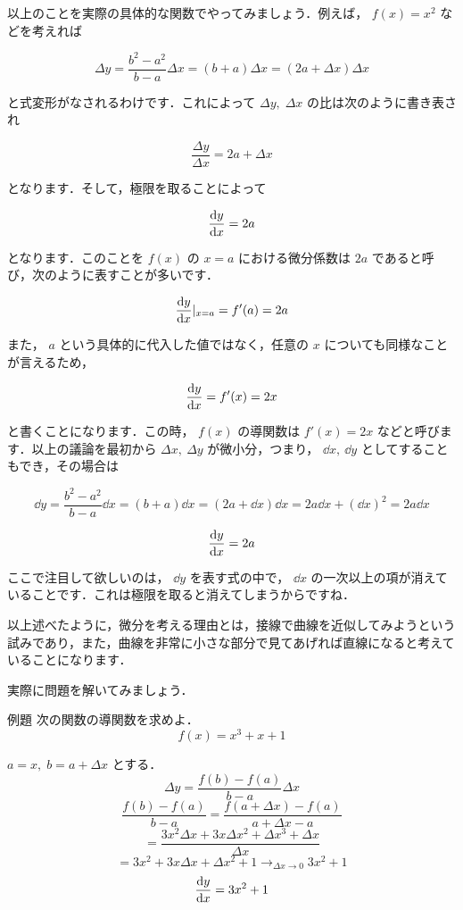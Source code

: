 \documentclass[
  b4paperpaper,
  xelatex,ja=standard]{bxjsbook}
\begin{document}
以上のことを実際の具体的な関数でやってみましょう．例えば， \(f(x)=x^2\)
などを考えれば

\[\Delta y = \frac{b^2-a^2}{b-a} \Delta x = (b+a) \Delta x = (2a+\Delta x) \Delta x\]

と式変形がなされるわけです．これによって \(\Delta y,\; \Delta x\)
の比は次のように書き表され

\[\frac{\Delta y}{\Delta x} = 2a + \Delta x\]

となります．そして，極限を取ることによって

\[\dv{y}{x}=2a\]

となります．このことを \(f(x)\) の \(x=a\) における微分係数は \(2a\)
であると呼び，次のように表すことが多いです．

\[ \dv{y}{x}|_{x=a}=f'(a)=2a\]

また， \(a\) という具体的に代入した値ではなく，任意の \(x\)
についても同様なことが言えるため，

\[ \dv{y}{x}=f'(x)=2x\]

と書くことになります．この時， \(f(x)\) の導関数は \(f'(x)=2x\)
などと呼びます．以上の議論を最初から \(\Delta x,\: \Delta y\)
が微小分，つまり， \(\dd x,\: \dd y\) としてすることもでき，その場合は

\[\dd y = \frac{b^2-a^2}{b-a} \dd x = (b+a) \dd x = (2a+\dd x) \dd x = 2a \dd x + (\dd x)^2= 2a \dd x\]

\[\dv{y}{x} = 2a\]

ここで注目して欲しいのは， \(\dd y\) を表す式の中で， \(\dd x\)
の一次以上の項が消えていることです．これは極限を取ると消えてしまうからですね．

以上述べたように，微分を考える理由とは，接線で曲線を近似してみようという試みであり，また，曲線を非常に小さな部分で見てあげれば直線になると考えていることになります．

実際に問題を解いてみましょう．

\begin{Rbox}{例題}
次の関数の導関数を求めよ． \[f(x)=x^3+x+1\]

\end{Rbox}


\(a=x,\;b=a+\Delta x\) とする．
\[\Delta y = \frac{f(b)-f(a)}{b-a}\Delta x\]
\[\frac{f(b)-f(a)}{b-a}=\frac{f(a+\Delta x)-f(a)}{a+\Delta x -a} \]
\[= \frac{3x^2\Delta x + 3x\Delta x^2 + \Delta x ^3 + \Delta x}{\Delta x}\]
\[=3x^2+ 3x\Delta x + \Delta x ^2 + 1 \to_{\Delta x \to 0} 3x^2+1\]
\[\dv{y}{x}=3x^2+1\]
\end{document}
